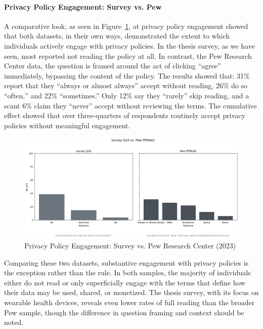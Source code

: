 	\paragraph{Privacy Policy Engagement: Survey vs. Pew}			
	A comparative look, as seen in Figure~\ref{fig:Q10_Pew_comparison}, at privacy policy engagement showed that both datasets, in their own ways, demonstrated the extent to which individuals actively engage with privacy policies.
	In the thesis survey, as we have seen, most reported not reading the policy at all. In contrast, the Pew Research Center data, the question is framed around the act of clicking “agree” immediately, bypassing the content of the policy. The results showed that: 31\% report that they “always or almost always” accept without reading, 26\% do so “often,” and 22\% “sometimes.” Only 12\% say they “rarely” skip reading, and a scant 6\% claim they “never” accept without reviewing the terms. The cumulative effect showed that over three-quarters of respondents routinely accept privacy policies without meaningful engagement.
	\begin{figure}[ht]\centering
		\includegraphics[width=1\linewidth]{figures/img/Pew_comparison_plots/compare_10_vs_PPREAD.png}
		\caption{Privacy Policy Engagement: Survey vs. Pew Research Center (2023)}
		\label{fig:Q10_Pew_comparison}
	\end{figure}
	Comparing these two datasets, substantive engagement with privacy policies is the exception rather than the rule. In both samples, the majority of individuals either do not read or only superficially engage with the terms that define how their data may be used, shared, or monetized. The thesis survey, with its focus on wearable health devices, reveals even lower rates of full reading than the broader Pew sample, though the difference in question framing and context should be noted.
